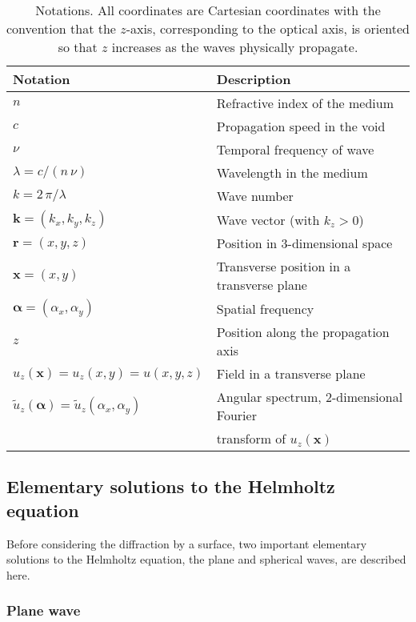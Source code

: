 \documentclass[a4paper]{article}
\newcommand*{\V}[1]{\boldsymbol{#1}}
\newcommand*{\FT}[1]{\widetilde{#1}}
\begin{document}
\begin{table}[t]
  \centering
  \begin{tabular}{ll}
    Notation & Description \\
    \hline
    $n$ & Refractive index of the medium\\
    $c$ & Propagation speed in the void\\
    $ν$ & Temporal frequency of wave\\
    $λ= c/(n\,ν)$ & Wavelength in the medium\\
    $k = 2\,π/λ$ & Wave number\\
    $\V{k} = (k_{x},k_{y},k_{z})$ & Wave vector (with $k_{z} > 0$)\\
    $\V{r} = (x,y,z)$ & Position in 3-dimensional space\\
    $\V{x} = (x,y)$ & Transverse position in a transverse plane\\
    $\V{α} = (α_{x},α_{y})$ & Spatial frequency\\
    $z$ & Position along the propagation axis\\
    $u_{z}(\V{x}) = u_{z}(x,y) = u(x,y,z)$ & Field in a transverse plane\\
    $\FT{u}_{z}(\V{α}) = \FT{u}_{z}(α_{x},α_{y})$
             & Angular spectrum, 2-dimensional Fourier\\
             & transform of $u_{z}(\V{x})$\\
  \end{tabular}
  \caption{Notations. All coordinates are Cartesian coordinates with the convention that
    the $z$-axis, corresponding to the optical axis, is oriented so that $z$ increases as
    the waves physically propagate.}
  \label{tab:notations}
\end{table}


\subsection{Elementary solutions to the Helmholtz equation}
\label{sec:elementary-solutions}

Before considering the diffraction by a surface, two important elementary solutions to the
Helmholtz equation, the plane and spherical waves, are described here.

\subsubsection{Plane wave}
\label{sec:plane_wave}
\end{document}
